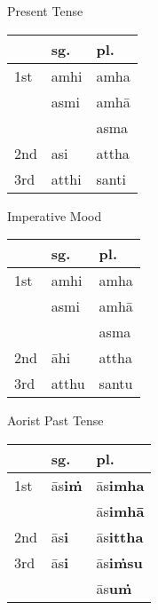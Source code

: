 \documentclass[a4paper]{memoir}
\begin{document}
{\centering\par
\begin{multicols}{3}

Present Tense

\begin{center}
\begin{tabular}{lll}
 & \textbf{sg.} & \textbf{pl.}\\[0pt]
\hline
1st & amhi & amha\\[0pt]
 & asmi & amhā\\[0pt]
 &  & asma\\[0pt]
2nd & asi & attha\\[0pt]
3rd & atthi & santi\\[0pt]
\end{tabular}
\end{center}

\columnbreak

Imperative Mood

\begin{center}
\begin{tabular}{lll}
 & \textbf{sg.} & \textbf{pl.}\\[0pt]
\hline
1st & amhi & amha\\[0pt]
 & asmi & amhā\\[0pt]
 &  & asma\\[0pt]
2nd & āhi & attha\\[0pt]
3rd & atthu & santu\\[0pt]
\end{tabular}
\end{center}

\columnbreak

Aorist Past Tense

\begin{center}
\begin{tabular}{lll}
 & \textbf{sg.} & \textbf{pl.}\\[0pt]
\hline
1st & ās\textbf{iṁ} & ās\textbf{imha}\\[0pt]
 &  & ās\textbf{imhā}\\[0pt]
2nd & ās\textbf{i} & ās\textbf{ittha}\\[0pt]
3rd & ās\textbf{i} & ās\textbf{iṁsu}\\[0pt]
 &  & ās\textbf{uṁ}\\[0pt]
\end{tabular}
\end{center}

\end{multicols}
\par}
\end{document}
